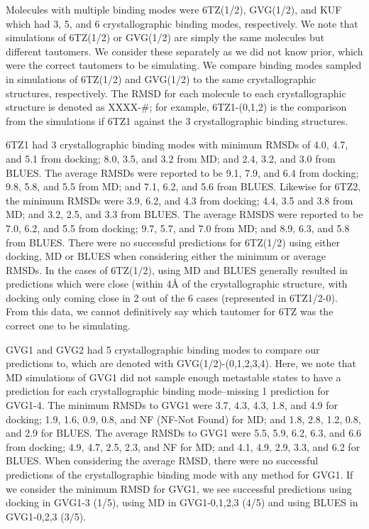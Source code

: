 Molecules with multiple binding modes were 6TZ(1/2), GVG(1/2), and KUF which had 3, 5, and 6 crystallographic binding modes, respectively.
We note that simulations of 6TZ(1/2) or GVG(1/2) are simply the same molecules but different tautomers.
We consider these separately as we did not know prior, which were the correct tautomers to be simulating.
We compare binding modes sampled in simulations of 6TZ(1/2) and GVG(1/2) to the same crystallographic structures, respectively.
The RMSD for each molecule to each crystallographic structure is denoted as XXXX-#; for example, 6TZ1-(0,1,2) is the comparison from the simulations if 6TZ1 against the 3 crystallographic binding structures.

6TZ1 had 3 crystallographic binding modes with minimum RMSDs of 4.0, 4.7, and 5.1 from docking; 8.0, 3.5, and 3.2 from MD; and 2.4, 3.2, and 3.0 from BLUES.
The average RMSDs were reported to be 9.1, 7.9, and 6.4 from docking; 9.8, 5.8, and 5.5 from MD; and 7.1, 6.2, and 5.6 from BLUES.
Likewise for 6TZ2, the minimum RMSDs were 3.9, 6.2, and 4.3 from docking; 4.4, 3.5 and 3.8 from MD; and 3.2, 2.5, and 3.3 from BLUES.
The average RMSDS were reported to be 7.0, 6.2, and 5.5 from docking; 9.7, 5.7, and 7.0 from MD; and 8.9, 6.3, and 5.8 from BLUES.
There were no successful predictions for 6TZ(1/2) using either docking, MD or BLUES when considering either the minimum or average RMSDs.
In the cases of 6TZ(1/2), using MD and BLUES generally resulted in predictions which were close (within 4{\AA} of the crystallographic structure, with docking only coming close in 2 out of the 6 cases (represented in 6TZ1/2-0).
From this data, we cannot definitively say which tautomer for 6TZ was the correct one to be simulating.

GVG1 and GVG2 had 5 crystallographic binding modes to compare our predictions to, which are denoted with GVG(1/2)-(0,1,2,3,4).
Here, we note that MD simulations of GVG1 did not sample enough metastable states to have a prediction for each crystallographic binding mode--missing 1 prediction for GVG1-4.
The minimum RMSDs to GVG1 were 3.7, 4.3, 4.3, 1.8, and 4.9 for docking; 1.9, 1.6, 0.9, 0.8, and NF (NF-Not Found) for MD; and 1.8, 2.8, 1.2, 0.8, and 2.9 for BLUES.
The average RMSDs to GVG1 were 5.5, 5.9, 6.2, 6.3, and 6.6 from docking; 4.9, 4.7, 2.5, 2.3, and NF for MD; and 4.1, 4.9, 2.9, 3.3, and 6.2 for BLUES.
When considering the average RMSD, there were no successful predictions of the crystallographic binding mode with any method for GVG1.
If we consider the minimum RMSD for GVG1, we see successful predictions using docking in GVG1-3 (1/5), using MD in GVG1-0,1,2,3 (4/5) and using BLUES in GVG1-0,2,3 (3/5).

